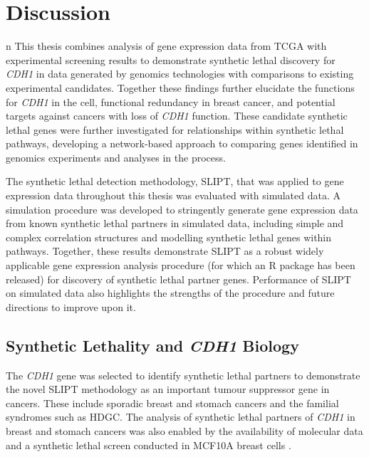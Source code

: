 \chapter{Discussion}
\label{chap:discussion}
n
This thesis combines analysis of \gls{gene expression} data from \gls{TCGA} with experimental screening results \citep{Telford2015} to demonstrate \gls{synthetic lethal} discovery for \textit{CDH1} in  data generated by \glspl{genomic} technologies with comparisons to existing experimental candidates. Together these findings further elucidate the functions for \textit{CDH1} in the cell, \gls{functional redundancy} in breast cancer, and potential targets against cancers with loss of \textit{CDH1} function. These candidate \gls{synthetic lethal} genes were further investigated for relationships within \gls{synthetic lethal} pathways, developing a network-based approach to comparing genes identified in \glspl{genomic} experiments and analyses in the process.

The \gls{synthetic lethal} detection methodology, \gls{SLIPT}, that was applied to \gls{gene expression} data throughout this thesis was evaluated with simulated data. A simulation procedure was developed to stringently generate \gls{gene expression} data from known \gls{synthetic lethal} partners in simulated data, including simple and complex correlation structures and modelling \gls{synthetic lethal} genes within pathways. Together, these results demonstrate \gls{SLIPT} as a robust widely applicable \gls{gene expression} analysis procedure (for which an R package has been released) for discovery of \gls{synthetic lethal} partner genes. Performance of \gls{SLIPT} on simulated data also highlights the strengths of the procedure and future directions to improve upon it.

\section{Synthetic Lethality and \textit{CDH1} Biology}
\label{chapt6:implications}

The \textit{CDH1} gene was selected to identify \gls{synthetic lethal} partners to demonstrate the novel \gls{SLIPT} methodology as an important \gls{tumour suppressor} gene in cancers. These include \gls{sporadic} breast and stomach cancers and the \gls{familial} syndromes such as \gls{HDGC}. The analysis of \gls{synthetic lethal} partners of \textit{CDH1} in breast and stomach cancers was also enabled by the availability of molecular data \citep{TCGA2012, TCGA2014GC} and a \gls{synthetic lethal} screen conducted in \gls{MCF10A} breast cells \citep{Chen2014, Telford2015}.

